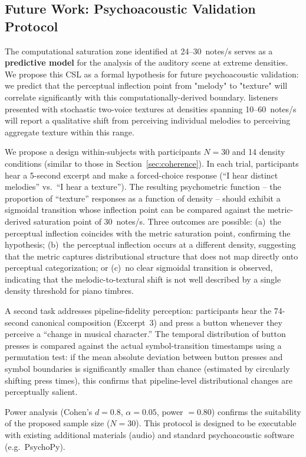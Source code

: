 \documentclass[a4paper]{article}
\theoremstyle{definition}
\theoremstyle{remark}
\begin{document}
\subsection{Future Work: Psychoacoustic Validation Protocol}
\label{sec:future_protocol}

The computational saturation zone identified at 24--30~notes/s serves as a \textbf{predictive model} for the analysis of the auditory scene at extreme densities. We propose this CSL as a formal hypothesis for future psychoacoustic validation: we predict that the perceptual inflection point from "melody" to "texture" will correlate significantly with this computationally-derived boundary. listeners presented with stochastic two-voice textures at densities spanning 10--60~notes/s will report a qualitative shift from perceiving individual melodies to perceiving aggregate texture within this range.

We propose a design within-subjects with participants $N = 30$ and 14 density conditions (similar to those in Section~\ref{sec:coherence}). In each trial, participants hear a 5-second excerpt and make a forced-choice response (``I hear distinct melodies'' vs.\ ``I hear a texture''). The resulting psychometric function -- the proportion of ``texture'' responses as a function of density -- should exhibit a sigmoidal transition whose inflection point can be compared against the metric-derived saturation point of 30~notes/s. Three outcomes are possible: (a)~the perceptual inflection coincides with the metric saturation point, confirming the hypothesis; (b)~the perceptual inflection occurs at a different density, suggesting that the metric captures distributional structure that does not map directly onto perceptual categorization; or (c)~no clear sigmoidal transition is observed, indicating that the melodic-to-textural shift is not well described by a single density threshold for piano timbres.

A second task addresses pipeline-fidelity perception: participants hear the 74-second canonical composition (Excerpt~3) and press a button whenever they perceive a ``change in musical character.'' The temporal distribution of button presses is compared against the actual symbol-transition timestamps using a permutation test: if the mean absolute deviation between button presses and symbol boundaries is significantly smaller than chance (estimated by circularly shifting press times), this confirms that pipeline-level distributional changes are perceptually salient.

Power analysis (Cohen's $d = 0.8$, $\alpha = 0.05$, power $= 0.80$) confirms the suitability of the proposed sample size ($N = 30$). This protocol is designed to be executable with existing additional materials (audio) and standard psychoacoustic software (e.g.\ PsychoPy).
\end{document}
